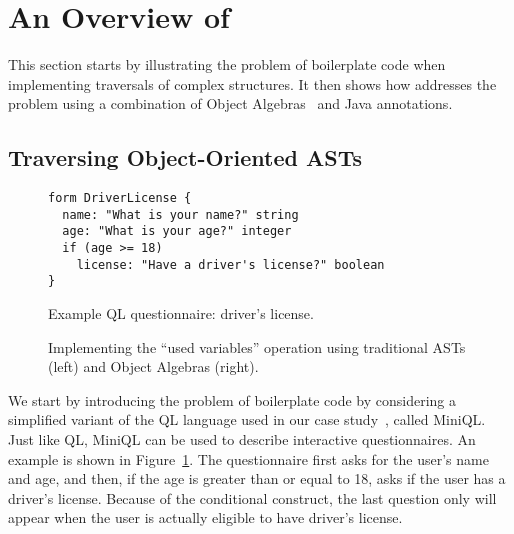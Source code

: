 \section{An Overview of \name}\label{subsec:overview}

This section starts by illustrating the problem of boilerplate code when implementing
traversals of complex structures. It then shows how \name addresses
the problem using a combination of Object Algebras~\cite{bruno12oa}
and Java annotations.

\subsection{Traversing Object-Oriented ASTs  }


\begin{figure}[t]
\nocaptionrule
\begin{lstlisting}[language=ql]
form DriverLicense {
  name: "What is your name?" string
  age: "What is your age?" integer
  if (age >= 18)
    license: "Have a driver's license?" boolean
}
\end{lstlisting}
\caption{Example QL questionnaire: driver's license.}
\vspace{-.15in}
\label{driver_license}
\end{figure}

\begin{figure*}[t]
  \nocaptionrule
  \begin{minipage}[t]{0.48\textwidth}
  \end{minipage}
  \vline
  \hspace*{2pt}
  \begin{minipage}[t]{0.48\textwidth}
  \end{minipage}

    \caption{Implementing the ``used variables'' operation using traditional ASTs (left) and Object Algebras (right).}\label{LST:usedVars}
\end{figure*}


We start by introducing the problem of boilerplate code by considering
a simplified variant of the QL language used in our case
study~\cite{gouseti14extensible}, called MiniQL.  Just like QL, MiniQL
can be used to describe interactive questionnaires. An example is
shown in Figure~\ref{driver_license}.  The questionnaire first asks
for the user's name and age, and then, if the age is greater than or
equal to 18, asks if the user has a driver's license.  Because of the
conditional construct, the last question only will appear when the
user is actually eligible to have driver's license.

